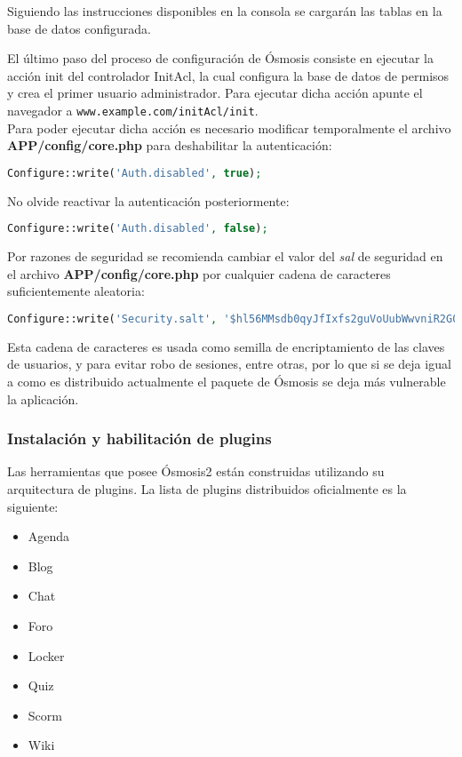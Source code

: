 Siguiendo las instrucciones disponibles en la consola se cargarán las tablas en la base de datos configurada.

El último paso del proceso de configuración de Ósmosis consiste en ejecutar la acción init del controlador InitAcl, la cual configura la base de datos de permisos y crea el primer usuario administrador. Para ejecutar dicha acción apunte el navegador a \texttt{www.example.com/initAcl/init}.\\

Para poder ejecutar dicha acción es necesario modificar temporalmente el archivo \textbf{APP/config/core.php} para deshabilitar la autenticación:
\begin{lstlisting}[language=PHP]
	Configure::write('Auth.disabled', true);
\end{lstlisting}

No olvide reactivar la autenticación posteriormente:
\begin{lstlisting}[language=PHP]
	Configure::write('Auth.disabled', false);
\end{lstlisting}

Por razones de seguridad se recomienda cambiar el valor del \emph{sal} de seguridad en el archivo \textbf{APP/config/core.php} por cualquier cadena de caracteres suficientemente aleatoria:
\begin{lstlisting}[language=PHP]
	Configure::write('Security.salt', '$hl56MMsdb0qyJfIxfs2guVoUubWwvniR2G0FgaC9mi');
\end{lstlisting}

Esta cadena de caracteres es usada como semilla de encriptamiento de las claves de usuarios, y para evitar robo de sesiones, entre otras, por lo que si se deja igual a como es distribuido actualmente el paquete de Ósmosis se deja más vulnerable la aplicación.

\subsubsection{Instalación y habilitación de plugins}
Las herramientas que posee Ósmosis2 están construidas utilizando su arquitectura de plugins. La lista de plugins distribuidos oficialmente es la siguiente:
\begin{itemize}
	\item Agenda
	\item Blog
	\item Chat
	\item Foro
	\item Locker
	\item Quiz
	\item Scorm
	\item Wiki
\end{itemize}

